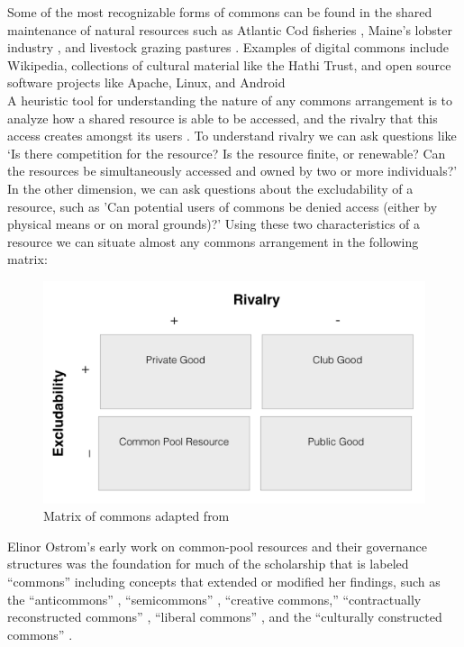 \documentclass[thesis,tocnosub,noragright,centerchapter,12pt]{uiucecethesis09}
\begin{document}
Some of the most recognizable forms of commons can be found in the
shared maintenance of natural resources such as Atlantic Cod fisheries
\citep{hutchings1994can,}, Maine's lobster industry \citep{acheson1988lobster},
and livestock grazing pastures \citep{ostrom1999revisiting}. Examples of digital commons include
Wikipedia, collections of cultural material like the Hathi Trust, and
open source software projects like Apache, Linux, and Android \citep{benkler2011penguin, madison2010constructing}\\

A heuristic tool for understanding the nature of any commons arrangement
is to analyze how a shared resource is able to be accessed, and the
rivalry that this access creates amongst its users \citep{ostrom1994rules}. To understand
rivalry we can ask questions like `Is there competition for the
resource? Is the resource finite, or renewable? Can the resources be
simultaneously accessed and owned by two or more individuals?' In the
other dimension, we can ask questions about the excludability of a resource,
such as 'Can potential users of commons be denied access (either by
physical means or on moral grounds)?' Using these two characteristics of
a resource we can situate almost any commons arrangement in the
following matrix:

\begin{figure}
\includegraphics[width=\textwidth]{CommonsMatrix}
\caption{Matrix of commons adapted from \citep[p.7]{ostrom1994rules}}
\label{fig:my_label}
\end{figure}


Elinor Ostrom's early work on common-pool resources and their governance
structures \citeyear{ostrom1990governing} was the foundation for much of the scholarship that is
labeled ``commons'' including concepts that extended or modified her
findings, such as the ``anticommons'' \citep{heller1998tragedy}, ``semicommons'' \citep{smith2000semicommon}, ``creative commons,'' ``contractually reconstructed
commons'' \citep{reichman2003contractually}, ``liberal commons'' \citep{dagan2001liberal}, and the ``culturally constructed commons'' \citep{madison2010constructing}.\\
\end{document}
